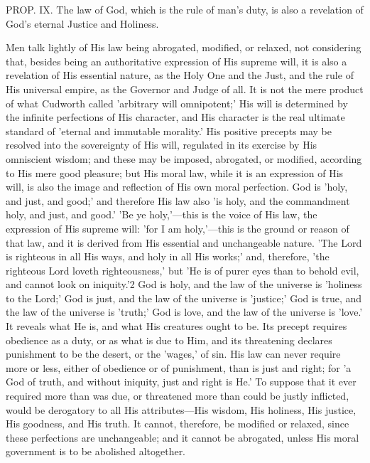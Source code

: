 \documentclass[
]{book}
\begin{document}
PROP. IX. The law of God, which is the rule of man's duty, is also a revelation of God's eternal Justice and Holiness.

Men talk lightly of His law being abrogated, modified, or relaxed, not considering that, besides being an authoritative expression of His supreme will, it is also a revelation of His essential nature, as the Holy One and the Just, and the rule of His universal empire, as the Governor and Judge of all. It is not the mere product of what Cudworth called 'arbitrary will omnipotent;' His will is determined by the infinite perfections of His character, and His character is the real ultimate standard of 'eternal and immutable morality.' His positive precepts may be resolved into the sovereignty of His will, regulated in its exercise by His omniscient wisdom; and these may be imposed, abrogated, or modified, according to His mere good pleasure; but His moral law, while it is an expression of His will, is also the image and reflection of His own moral perfection. God is 'holy, and just, and good;' and therefore His law also 'is holy, and the commandment holy, and just, and good.' 'Be ye holy,'---this is the voice of His law, the expression of His supreme will: 'for I am holy,'---this is the ground or reason of that law, and it is derived from His essential and unchangeable nature. 'The Lord is righteous in all His ways, and holy in all His works;' and, therefore, 'the righteous Lord loveth righteousness,' but 'He is of purer eyes than to behold evil, and cannot look on iniquity.'2 God is holy, and the law of the universe is 'holiness to the Lord;' God is just, and the law of the universe is 'justice;' God is true, and the law of the universe is 'truth;' God is love, and the law of the universe is 'love.' It reveals what He is, and what His creatures ought to be. Its precept requires obedience as a duty, or as what is due to Him, and its threatening declares punishment to be the desert, or the 'wages,' of sin. His law can never require more or less, either of obedience or of punishment, than is just and right; for 'a God of truth, and without iniquity, just and right is He.' To suppose that it ever required more than was due, or threatened more than could be justly inflicted, would be derogatory to all His attributes---His wisdom, His holiness, His justice, His goodness, and His truth. It cannot, therefore, be modified or relaxed, since these perfections are unchangeable; and it cannot be abrogated, unless His moral government is to be abolished altogether.
\end{document}

